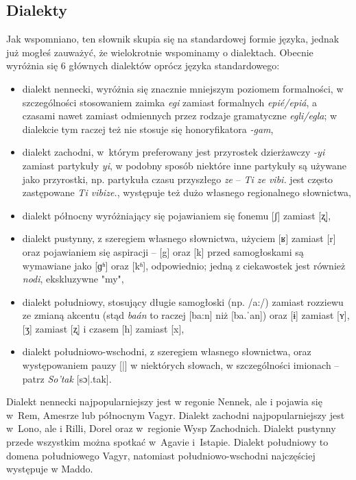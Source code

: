 \begin{spacing}{1.1}
\subsection{Dialekty}
Jak wspomniano, ten słownik skupia się na standardowej formie języka, jednak już
mogłeś zauważyć, że wielokrotnie wspominamy o dialektach. Obecnie wyróżnia się 6
głównych dialektów oprócz języka standardowego:

\begin{itemize}
    \item dialekt nennecki, wyróżnia się znacznie mniejszym poziomem
    formalności, w szczególności stosowaniem zaimka \emph{egi} zamiast
    formalnych \emph{epié/epiá}, a czasami nawet zamiast odmiennych przez
    rodzaje gramatyczne \emph{egli/egla}; w dialekcie tym raczej też nie stosuje
    się honoryfikatora \emph{-gam},
    \item dialekt zachodni, w~którym preferowany jest przyrostek dzierżawczy
    \emph{-yi} zamiast partykuły \emph{yi}, w podobny sposób niektóre inne
    partykuły są używane jako przyrostki, np. partykuła czasu przyszłego
    \emph{ze} -- \emph{Ti ze vibi.} jest często zastępowane \emph{Ti vibize.},
    występuje też dużo własnego regionalnego słownictwa,
    \item dialekt północny wyróżniający się pojawianiem się fonemu [ʃ] zamiast
    [ʐ],
    \item dialekt pustynny, z szeregiem własnego słownictwa, użyciem [ʁ] zamiast
    [r] oraz pojawianiem się aspiracji -- [g] oraz [k] przed samogłoskami są
    wymawiane jako [ɡʱ] oraz [kʱ], odpowiednio; jedną z ciekawostek jest również
    \emph{nodi}, ekskluzywne "my",
    \item dialekt południowy, stosujący długie samogłoski (np. /a:/) zamiast
    rozziewu ze zmianą akcentu (stąd \emph{baán} to raczej [ba:n] niż [ba.ˈan])
    oraz [ɨ] zamiast [ʏ], [ʒ] zamiast [ʐ] i czasem [h] zamiast [x],
    \item dialekt południowo-wschodni, z szeregiem własnego słownictwa, oraz
    występowaniem pauzy [|] w niektórych słowach, w szczególności imionach --
    patrz \emph{So'tak} [sɔ|.tak].
\end{itemize}

Dialekt nennecki najpopularniejszy jest w regonie Nennek, ale i pojawia się
w~Rem, Amesrze lub północnym Vagyr. Dialekt zachodni najpopularniejszy jest
w~Lono, ale i Rilli, Dorel oraz w~regionie Wysp Zachodnich. Dialekt pustynny
przede wszystkim można spotkać w~Agavie i~Istapie. Dialekt południowy to domena
południowego Vagyr, natomiast południowo-wschodni najczęściej występuje w Maddo.

\end{spacing}